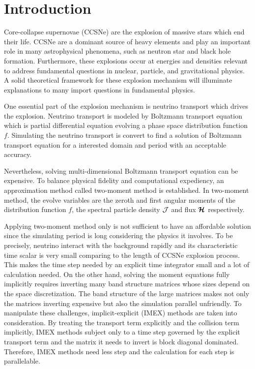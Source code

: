 \section{Introduction}

Core-collapse supernovae (CCSNe) are the explosion of massive stars which end their life.
CCSNe are a dominant source of heavy elements and play an important role in many astrophysical phenomena, such as neutron star and black hole formation.  
Furthermore, these explosions occur at energies and densities relevant to address fundamental questions in nuclear, particle, and gravitational physics. 
A solid theoretical framework for these explosion mechanism will illuminate explanations to many import questions in fundamental physics.

One essential part of the explosion mechanism is neutrino transport which drives the explosion.  
Neutrino transport is modeled by Boltzmann transport equation which is partial differential equation evolving a phase space distribution function $f$.
Simulating the neutrino transport is convert to find a solution of Boltzmann transport equation for a interested domain and period with an acceptable accuracy.

Nevertheless, solving multi-dimensional Boltzmann transport equation can be expensive.
To balance physical fidelity and computational expediency, an approximation method called two-moment method is established.
In two-moment method, the evolve variables are the zeroth and first angular moments of the distribution function $f$, the spectral particle density $\mathcal{J}$ and flux $\boldsymbol{\mathcal{H}}$ respectively.

Applying two-moment method only is not sufficient to have an affordable solution since the simulating period is long considering the physics it involves.
To be precisely, neutrino interact with the background rapidly and its characteristic time scalar is very small comparing to the length of CCSNe explosion process. 
This makes the time step needed by an explicit time integrator small and a lot of calculation needed. 
On the other hand, solving the moment equations fully implicitly requires inverting many band structure matrices whose sizes depend on the space discretization.
The band structure of the large matrices makes not only the matrices inverting expensive but also the simulation parallel unfriendly.
To manipulate these challenges, implicit-explicit (IMEX) methods are taken into consideration.
By treating the transport term explicitly and the collision term implicitly, IMEX methods subject only to a time step governed by the explicit transport term and the matrix it needs to invert is block diagonal dominated.
Therefore, IMEX methods need less step and the calculation for each step is parallelable.  


